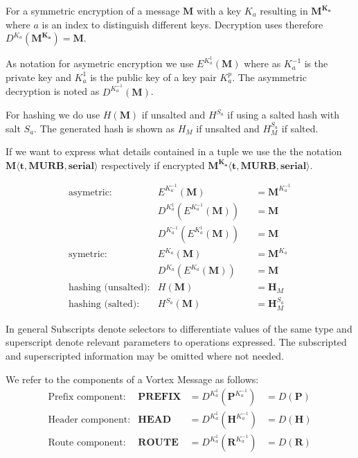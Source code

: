 For a symmetric encryption of a message $\mathbf{M}$ with a key $K_a$ resulting in $\mathbf{M^{K_a}}$ where $a$ is an index to distinguish different keys. Decryption uses therefore $D^{K_a}(\mathbf{M^{K_a}})=\mathbf{M}$.

As notation for asymetric encryption we use $E^{K^{1}_a}(\mathbf{M})$ where as $K^{-1}_a$ is the private key and $K^{1}_a$ is the public key of a key pair $K^p_a$. The asymmetric decryption is noted as $D^{K^{-1}_a}(\mathbf{M})$.

For hashing we do use $H(\mathbf{M})$ if unsalted and $H^{S_a}$ if using a salted hash with salt $S_a$. The generated hash is shown as $H_M$ if unsalted and $H^{S_a}_M$ if salted.

If we want to express what details contained in a tuple we use the the notation $\mathbf{M\langle t,MURB,serial\rangle }$ respectively if encrypted $\mathbf{M^{K_{a}}\langle t,MURB,serial\rangle}$.

\begin{align*}
\text{asymetric:}         & E^{K^{-1}_a}\left(\mathbf{M}\right)                        	&& =\mathbf{M}^{K^{-1}_a}\\
                          & D^{K^{1}_a}\left(E^{K^{-1}_a}\left(\mathbf{M}\right)\right)	&& =\mathbf{M}\\
                          & D^{K^{-1}_a}\left(E^{K^{1}_a}\left(\mathbf{M}\right)\right)	&& =\mathbf{M}\\
\text{symetric:}          & E^{K_a}\left(\mathbf{M}\right)                             	&& =\mathbf{M}^{K_a}\\
      		              & D^{K_a}\left(E^{K_a}\left(\mathbf{M}\right)\right)          && =\mathbf{M}\\
\text{hashing (unsalted):}& H\left(\mathbf{M}\right)                                   	&& =\mathbf{H}_M\\
\text{hashing (salted):}  & H^{S_a}\left(\mathbf{M}\right)                             	&& =\mathbf{H}^{S_a}_M
\end{align*}

In general Subscripts denote selectors to differentiate values of the same type and superscript denote relevant parameters to operations expressed. The subscripted and superscripted information may be omitted where not needed.

We refer to the components of a Vortex Message as follows:
\begin{align*}
\text{Prefix component:}         & \mathbf{PREFIX}             	&=D^{K^{1}_a}\left(\mathbf{P}^{K^{-1}_a}\right) &=D\left(\mathbf{P}\right)\\
\text{Header component:}         & \mathbf{HEAD}             	&=D^{K^{1}_a}\left(\mathbf{H}^{K^{-1}_a}\right) &=D\left(\mathbf{H}\right)\\
\text{Route component:}         & \mathbf{ROUTE}             	&=D^{K^{1}_a}\left(\mathbf{R}^{K^{-1}_a}\right) &=D\left(\mathbf{R}\right)\\
\end{align*}

